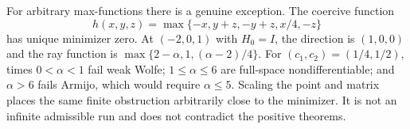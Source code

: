 For arbitrary max-functions there is a genuine exception. The coercive function
\[
 h(x,y,z)=\max\{-x,y+z,-y+z,x/4,-z\}
\]
has unique minimizer zero. At $(-2,0,1)$ with $H_0=I$, the direction is $(1,0,0)$ and the ray function is $\max\{2-\alpha,1,(\alpha-2)/4\}$. For $(c_1,c_2)=(1/4,1/2)$, times $0<\alpha<1$ fail weak Wolfe; $1\le\alpha\le6$ are full-space nondifferentiable; and $\alpha>6$ fails Armijo, which would require $\alpha\le5$. Scaling the point and matrix places the same finite obstruction arbitrarily close to the minimizer. It is not an infinite admissible run and does not contradict the positive theorems.
